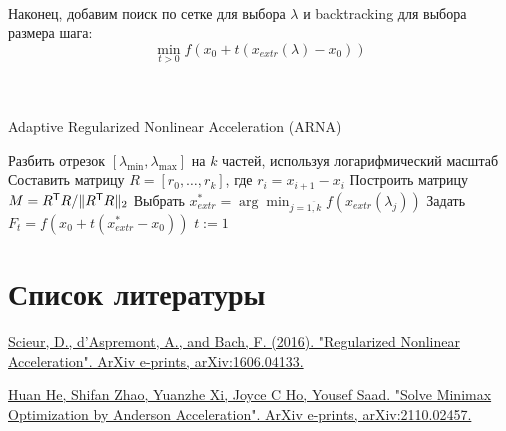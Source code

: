 \documentclass[12pt]{article}
\theoremstyle{definition}
\numberwithin{Def}{section}
\numberwithin{Th}{section}
\numberwithin{Prop}{section}
\numberwithin{St}{section}
\numberwithin{Cor}{section}
\begin{document}
\paragraph{}Наконец, добавим поиск по сетке для выбора $\lambda$ и backtracking
для выбора размера шага:
$$
\min_{t>0}f(x_0+t(x_{extr}(\lambda)-x_0))
$$
\\\\
\begin{algorithm*}[H]
\caption{Adaptive Regularized Nonlinear Acceleration (ARNA)}
\LinesNumbered
 Разбить отрезок $[\lambda_{\min},\lambda_{\max}]$ на $k$ частей, используя
 логарифмический масштаб\;
 Составить матрицу $R=[r_0,\ldots,r_k]$, где $r_i=x_{i+1}-x_i$\;
 Построить матрицу $M=R^\mathsf{T}R/\|R^\mathsf{T}R\|_2$\;
 Выбрать $x^*_{extr}=\arg\min_{j=\overline{1,k}}
 f(x_{extr}(\lambda_j))$\;
 Задать $F_t=f(x_0+t(x^*_{extr}-x_0))$\;
 $t:=1$\;
\end{algorithm*}

\section{Список литературы}

\begin{enumerate}[{[}1{]}]
	\item \hyperlink{https://arxiv.org/abs/1606.04133}{Scieur, D., d’Aspremont, A., and Bach, F. (2016). "Regularized Nonlinear Acceleration". ArXiv e-prints, arXiv:1606.04133.}
	\item \hyperlink{https://arxiv.org/abs/2110.02457}{Huan He, Shifan Zhao, Yuanzhe Xi, Joyce C Ho, Yousef Saad. "Solve Minimax Optimization by Anderson Acceleration". ArXiv e-prints, arXiv:2110.02457.}

\end{enumerate}
\end{document}
